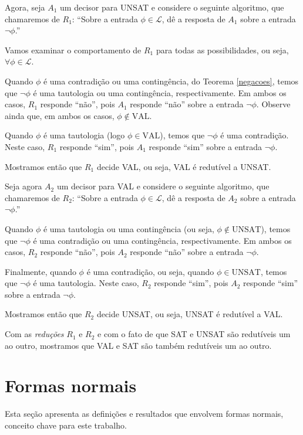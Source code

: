 \begin{prova}
Agora, seja $A_1$ um decisor para UNSAT e considere o seguinte algoritmo, que chamaremos de $R_1$: ``Sobre a entrada $\phi \in \mathcal{L}$, dê a resposta de $A_1$ sobre a entrada $\neg \phi$.''

Vamos examinar o comportamento de $R_1$ para todas as possibilidades, ou seja, $\forall \phi \in \mathcal{L}$.

Quando $\phi$ é uma contradição ou uma contingência, do Teorema \ref{negacoes}, temos que $\neg \phi$ é uma tautologia ou uma contingência, respectivamente. Em ambos os casos, $R_1$ responde ``não'', pois $A_1$ responde ``não'' sobre a entrada $\neg \phi$. Observe ainda que, em ambos os casos, $\phi \notin \text{VAL}$.

Quando $\phi$ é uma tautologia (logo $\phi \in \text{VAL}$), temos que $\neg \phi$ é uma contradição. Neste caso, $R_1$ responde ``sim'', pois $A_1$ responde ``sim'' sobre a entrada $\neg \phi$.

Mostramos então que $R_1$ decide VAL, ou seja, VAL é redutível a UNSAT.

Seja agora $A_2$ um decisor para VAL e considere o seguinte algoritmo, que chamaremos de $R_2$: ``Sobre a entrada $\phi \in \mathcal{L}$, dê a resposta de $A_2$ sobre a entrada $\neg \phi$.''

Quando $\phi$ é uma tautologia ou uma contingência (ou seja, $\phi \notin \text{UNSAT}$), temos que $\neg \phi$ é uma contradição ou uma contingência, respectivamente. Em ambos os casos, $R_2$ responde ``não'', pois $A_2$ responde ``não'' sobre a entrada $\neg \phi$.

Finalmente, quando $\phi$ é uma contradição, ou seja, quando $\phi \in \text{UNSAT}$, temos que $\neg \phi$ é uma tautologia. Neste caso, $R_2$ responde ``sim'', pois $A_2$ responde ``sim'' sobre a entrada $\neg \phi$.

Mostramos então que $R_2$ decide UNSAT, ou seja, UNSAT é redutível a VAL.

Com as \emph{reduções} $R_1$ e $R_2$ e com o fato de que SAT e UNSAT são redutíveis um ao outro, mostramos que VAL e SAT são também redutíveis um ao outro.
\end{prova}

\section{Formas normais}

\indent

Esta seção apresenta as definições e resultados que envolvem formas normais, conceito chave para este trabalho.

